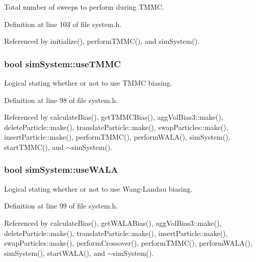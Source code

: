 Total number of sweeps to perform during T\-M\-M\-C. 



Definition at line 103 of file system.\-h.



Referenced by initialize(), perform\-T\-M\-M\-C(), and sim\-System().

\hypertarget{classsim_system_aa474a50b6353c8897331b1ab1ce53ab1}{
\subsubsection[{use\-T\-M\-M\-C}]{\setlength{\rightskip}{0pt plus 5cm}bool sim\-System\-::use\-T\-M\-M\-C}}\label{classsim_system_aa474a50b6353c8897331b1ab1ce53ab1}


Logical stating whether or not to use T\-M\-M\-C biasing. 



Definition at line 98 of file system.\-h.



Referenced by calculate\-Bias(), get\-T\-M\-M\-C\-Bias(), agg\-Vol\-Bias3\-::make(), delete\-Particle\-::make(), translate\-Particle\-::make(), swap\-Particles\-::make(), insert\-Particle\-::make(), perform\-T\-M\-M\-C(), perform\-W\-A\-L\-A(), sim\-System(), start\-T\-M\-M\-C(), and $\sim$sim\-System().

\hypertarget{classsim_system_aa83b00006b3919fb6e13f1bdeadece6a}{
\subsubsection[{use\-W\-A\-L\-A}]{\setlength{\rightskip}{0pt plus 5cm}bool sim\-System\-::use\-W\-A\-L\-A}}\label{classsim_system_aa83b00006b3919fb6e13f1bdeadece6a}


Logical stating whether or not to use Wang-\/\-Landau biasing. 



Definition at line 99 of file system.\-h.



Referenced by calculate\-Bias(), get\-W\-A\-L\-A\-Bias(), agg\-Vol\-Bias3\-::make(), delete\-Particle\-::make(), translate\-Particle\-::make(), insert\-Particle\-::make(), swap\-Particles\-::make(), perform\-Crossover(), perform\-T\-M\-M\-C(), perform\-W\-A\-L\-A(), sim\-System(), start\-W\-A\-L\-A(), and $\sim$sim\-System().


